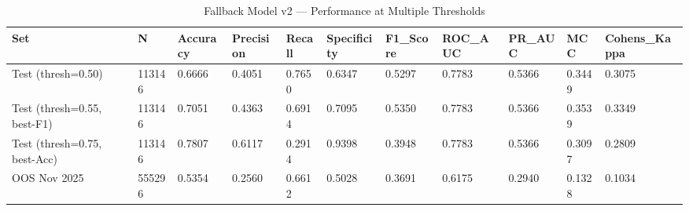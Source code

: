 \begin{table}[ht]
\centering
\caption{Fallback Model v2 — Performance at Multiple Thresholds}
\label{tab:thresholds}
\begin{tabular}{lllllllllll}
\hline
Set & N & Accuracy & Precision & Recall & Specificity & F1_Score & ROC_AUC & PR_AUC & MCC & Cohens_Kappa \\
\hline
Test (thresh=0.50) & 113146 & 0.6666 & 0.4051 & 0.7650 & 0.6347 & 0.5297 & 0.7783 & 0.5366 & 0.3449 & 0.3075 \\
Test (thresh=0.55, best-F1) & 113146 & 0.7051 & 0.4363 & 0.6914 & 0.7095 & 0.5350 & 0.7783 & 0.5366 & 0.3539 & 0.3349 \\
Test (thresh=0.75, best-Acc) & 113146 & 0.7807 & 0.6117 & 0.2914 & 0.9398 & 0.3948 & 0.7783 & 0.5366 & 0.3097 & 0.2809 \\
OOS Nov 2025 & 555296 & 0.5354 & 0.2560 & 0.6612 & 0.5028 & 0.3691 & 0.6175 & 0.2940 & 0.1328 & 0.1034 \\
\hline
\end{tabular}
\end{table}